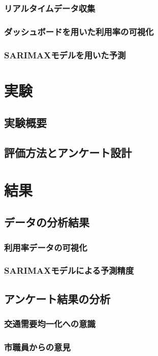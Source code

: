 \documentclass[uplatex,a4j,10pt,titlepage]{jsarticle}
\begin{document}
\subsubsection{リアルタイムデータ収集}
\subsubsection{ダッシュボードを用いた利用率の可視化}
\subsubsection{SARIMAXモデルを用いた予測}

\section{実験}
\subsection{実験概要}
\subsection{評価方法とアンケート設計}

\section{結果}
\subsection{データの分析結果}
\subsubsection{利用率データの可視化}
\subsubsection{SARIMAXモデルによる予測精度}
\subsection{アンケート結果の分析}
\subsubsection{交通需要均一化への意識}
\subsubsection{市職員からの意見}
\end{document}
